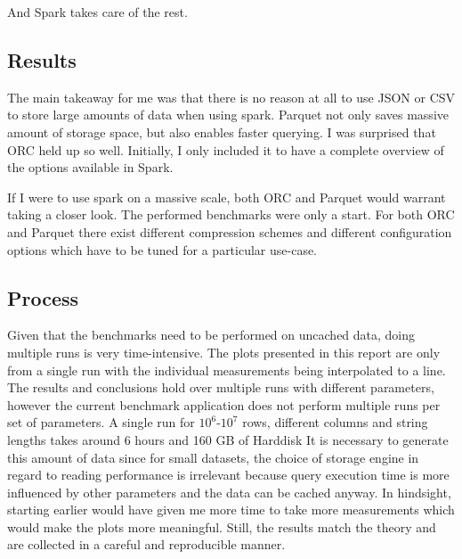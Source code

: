 And Spark takes care of the rest.

\subsection{Results}
The main takeaway for me was that there is no reason at all to use JSON or CSV to store large amounts of data when using spark.
Parquet not only saves massive amount of storage space, but also enables faster querying.
I was surprised that ORC held up so well.
Initially, I only included it to have a complete overview of the options available in Spark.

If I were to use spark on a massive scale, both ORC and Parquet would warrant taking a closer look.
The performed benchmarks were only a start.
For both ORC and Parquet there exist different compression schemes and different configuration options which have to be tuned for a particular use-case.

\subsection{Process}
Given that the benchmarks need to be performed on uncached data, doing multiple runs is very time-intensive.
The plots presented in this report are only from a single run with the individual measurements being interpolated to a line.
The results and conclusions hold over multiple runs with different parameters, however the current benchmark application does not perform multiple runs per set of parameters.
A single run for $10^6$-$10^7$ rows, different columns and string lengths takes around 6 hours and 160 GB of Harddisk
It is necessary to generate this amount of data since for small datasets, the choice of storage engine in regard to reading performance is irrelevant because query execution time is more influenced by other parameters and the data can be cached anyway.
In hindsight, starting earlier would have given me more time to take more measurements which would make the plots more meaningful.
Still, the results match the theory and are collected in a careful and reproducible manner.